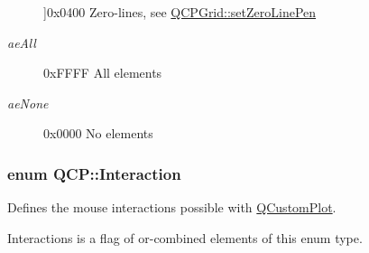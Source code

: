 \begin{Desc}
\begin{description}
{}]{\ttfamily 0x0400} \-Zero-\/lines, see \hyperlink{classQCPGrid_a209f40fdb252397b418b82d3494d8ea0}{\-Q\-C\-P\-Grid\-::set\-Zero\-Line\-Pen} \item[{\em 
\hypertarget{namespaceQCP_ae55dbe315d41fe80f29ba88100843a0caa897c232a0ffc8368e7c100ffc59ef31}{ae\-All}\label{namespaceQCP_ae55dbe315d41fe80f29ba88100843a0caa897c232a0ffc8368e7c100ffc59ef31}
}]{\ttfamily 0x\-F\-F\-F\-F} \-All elements \item[{\em 
\hypertarget{namespaceQCP_ae55dbe315d41fe80f29ba88100843a0caa9e90d81896358757d94275aeaa58f6a}{ae\-None}\label{namespaceQCP_ae55dbe315d41fe80f29ba88100843a0caa9e90d81896358757d94275aeaa58f6a}
}]{\ttfamily 0x0000} \-No elements \end{description}
\end{Desc}

\hypertarget{namespaceQCP_a2ad6bb6281c7c2d593d4277b44c2b037}{
\subsubsection[{\-Interaction}]{\setlength{\rightskip}{0pt plus 5cm}enum {\bf \-Q\-C\-P\-::\-Interaction}}}\label{namespaceQCP_a2ad6bb6281c7c2d593d4277b44c2b037}
\-Defines the mouse interactions possible with \hyperlink{classQCustomPlot}{\-Q\-Custom\-Plot}.

{\ttfamily \-Interactions} is a flag of or-\/combined elements of this enum type.

